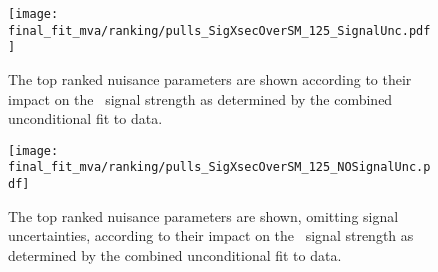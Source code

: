\begin{figure}[ht]
  \centering
  \texttt{[image: final\_fit\_mva/ranking/pulls\_SigXsecOverSM\_125\_SignalUnc.pdf]}
  \caption{The top ranked nuisance parameters are shown according to their impact
    on the \VHbb\ signal strength as determined by the combined unconditional
    fit to data.}
  \label{fig:Rank_012L_MVAVH}
\end{figure}
\begin{figure}[ht]
  \centering
  \texttt{[image: final\_fit\_mva/ranking/pulls\_SigXsecOverSM\_125\_NOSignalUnc.pdf]}
  \caption{The top ranked nuisance parameters are shown, omitting signal
    uncertainties, according to their impact on the \VHbb\ signal strength as
    determined by the combined unconditional fit to data.}
  \label{fig:Rank_012L_MVAVH_nosig}
\end{figure}
